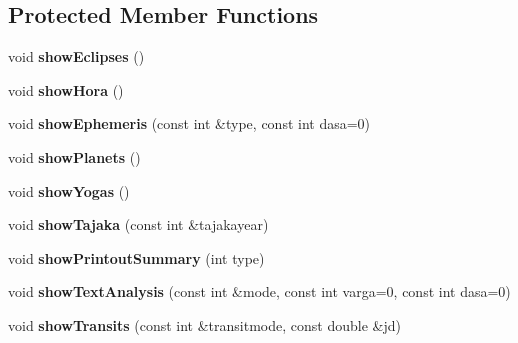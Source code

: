 \subsection*{Protected Member Functions}
\begin{DoxyCompactItemize}
\item 
\hypertarget{classMaitreyaTextclient_a36864894e16bfbbd1299265f9188deda}{void {\bfseries show\-Eclipses} ()}\label{classMaitreyaTextclient_a36864894e16bfbbd1299265f9188deda}

\item 
\hypertarget{classMaitreyaTextclient_a1d74e7bcdc29db7d738cfa79497b88db}{void {\bfseries show\-Hora} ()}\label{classMaitreyaTextclient_a1d74e7bcdc29db7d738cfa79497b88db}

\item 
\hypertarget{classMaitreyaTextclient_a5fe752c6cd2899f72c3c5f3e47e92080}{void {\bfseries show\-Ephemeris} (const int \&type, const int dasa=0)}\label{classMaitreyaTextclient_a5fe752c6cd2899f72c3c5f3e47e92080}

\item 
\hypertarget{classMaitreyaTextclient_ad539bf38280197575aee691cd6d258b8}{void {\bfseries show\-Planets} ()}\label{classMaitreyaTextclient_ad539bf38280197575aee691cd6d258b8}

\item 
\hypertarget{classMaitreyaTextclient_a4d87a40ec10fd7d9c2836ea68a3adf70}{void {\bfseries show\-Yogas} ()}\label{classMaitreyaTextclient_a4d87a40ec10fd7d9c2836ea68a3adf70}

\item 
\hypertarget{classMaitreyaTextclient_a7b1b1b74795417bc46bc0758fe5cb52d}{void {\bfseries show\-Tajaka} (const int \&tajakayear)}\label{classMaitreyaTextclient_a7b1b1b74795417bc46bc0758fe5cb52d}

\item 
\hypertarget{classMaitreyaTextclient_ae6bdca85cffd78788d35a2023bc5394e}{void {\bfseries show\-Printout\-Summary} (int type)}\label{classMaitreyaTextclient_ae6bdca85cffd78788d35a2023bc5394e}

\item 
\hypertarget{classMaitreyaTextclient_af49d1e239d252d89c9b22a06f6ee2d5a}{void {\bfseries show\-Text\-Analysis} (const int \&mode, const int varga=0, const int dasa=0)}\label{classMaitreyaTextclient_af49d1e239d252d89c9b22a06f6ee2d5a}

\item 
\hypertarget{classMaitreyaTextclient_a544e6eca5e5481e2aee03a55669ca37f}{void {\bfseries show\-Transits} (const int \&transitmode, const double \&jd)}\label{classMaitreyaTextclient_a544e6eca5e5481e2aee03a55669ca37f}


\end{DoxyCompactItemize}
